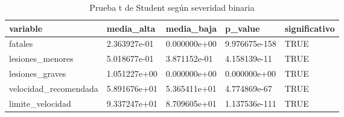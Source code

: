\begin{table}[ht]
\centering
\caption{Prueba t de Student según severidad binaria} 
\begin{tabular}{lllll}
  \hline
variable & media\_alta & media\_baja & p\_value & significativo \\ 
  \hline
fatales & 2.363927e-01 & 0.000000e+00 & 9.976675e-158 & TRUE \\ 
  lesiones\_menores & 5.018677e-01 & 3.871152e-01 &  4.158139e-11 & TRUE \\ 
  lesiones\_graves & 1.051227e+00 & 0.000000e+00 &  0.000000e+00 & TRUE \\ 
  velocidad\_recomendada & 5.891676e+01 & 5.365411e+01 &  4.774869e-67 & TRUE \\ 
  limite\_velocidad & 9.337247e+01 & 8.709605e+01 & 1.137536e-111 & TRUE \\ 
   \hline
\end{tabular}
\end{table}

